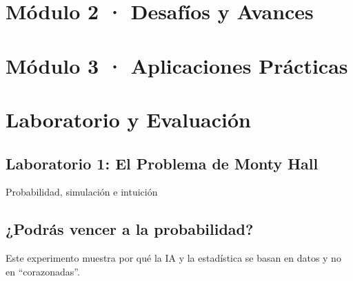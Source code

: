 \documentclass[
  spanish,
  letterpaper,
  DIV=11,
  numbers=noendperiod,
  oneside]{scrreprt}
\begin{document}
\part{Módulo 2 · Desafíos y Avances}

\chapter{}\label{section-1}

\part{Módulo 3 · Aplicaciones Prácticas}

\chapter{}\label{section-2}

\part{Laboratorio y Evaluación}

\chapter{Laboratorio 1: El Problema de Monty
Hall}\label{laboratorio-1-el-problema-de-monty-hall}

Probabilidad, simulación e intuición

\hfill\break

\chapter{¿Podrás vencer a la
probabilidad?}\label{podruxe1s-vencer-a-la-probabilidad}

Este experimento muestra por qué la IA y la estadística se basan en
datos y no en ``corazonadas''.
\end{document}
